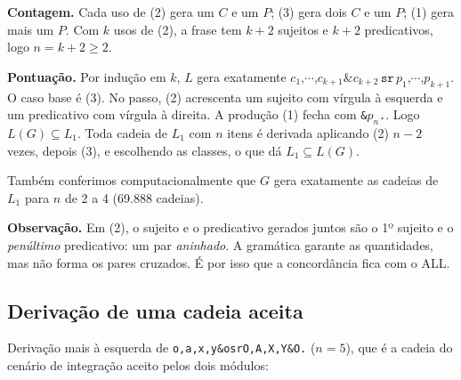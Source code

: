 \documentclass[11pt,a4paper]{article}
\newcommand{\cad}[1]{\texttt{#1}}       %
\newcommand{\Lum}{L_1}
\begin{document}
\textbf{Contagem.} Cada uso de (2) gera um $C$ e um $P$; (3) gera dois $C$ e um $P$; (1) gera mais um $P$. Com $k$ usos de (2), a frase tem $k+2$ sujeitos e $k+2$ predicativos, logo $n=k+2\ge2$.

\textbf{Pontuação.} Por indução em $k$, $L$ gera exatamente $c_1\cad{,}\cdots\cad{,}c_{k+1}\cad{\&}c_{k+2}\,\cad{sr}\,p_1\cad{,}\cdots\cad{,}p_{k+1}$. O caso base é (3). No passo, (2) acrescenta um sujeito com vírgula à esquerda e um predicativo com vírgula à direita. A produção (1) fecha com \cad{\&}$p_n$\cad{.}. Logo $L(G)\subseteq\Lum$. Toda cadeia de $\Lum$ com $n$ itens é derivada aplicando (2) $n-2$ vezes, depois (3), e escolhendo as classes, o que dá $\Lum\subseteq L(G)$.

Também conferimos computacionalmente que $G$ gera exatamente as cadeias de $\Lum$ para $n$ de 2 a 4 (69.888 cadeias).

\textbf{Observação.} Em (2), o sujeito e o predicativo gerados juntos são o 1º sujeito e o \emph{penúltimo} predicativo: um par \emph{aninhado}. A gramática garante as quantidades, mas não forma os pares cruzados. É por isso que a concordância fica com o ALL.

\subsection{Derivação de uma cadeia aceita}

Derivação mais à esquerda de \cad{o,a,x,y\&osrO,A,X,Y\&O.} ($n=5$), que é a cadeia do cenário de integração aceito pelos dois módulos:
\end{document}
